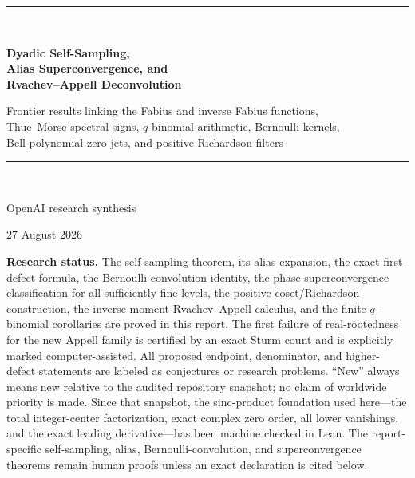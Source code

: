\documentclass[11pt]{article}
\numberwithin{equation}{section}
\theoremstyle{definition}
\theoremstyle{remark}
\begin{document}
\hypersetup{pageanchor=false}

\begin{titlepage}
\centering
\vspace*{1.0cm}
{\color{navy}\rule{0.84\textwidth}{1.2pt}}\\[0.95cm]
{\Huge\bfseries\color{navy} Dyadic Self-Sampling,\\[0.18em]
Alias Superconvergence, and\\[0.18em]
Rvachev--Appell Deconvolution\par}
\vspace{0.65cm}
{\Large\color{teal}Frontier results linking the Fabius and inverse Fabius functions,\\
Thue--Morse spectral signs, $q$-binomial arithmetic, Bernoulli kernels,\\
Bell-polynomial zero jets, and positive Richardson filters\par}
\vspace{0.9cm}
{\color{navy}\rule{0.84\textwidth}{0.6pt}}\\[1.15cm]
{\large OpenAI research synthesis\par}
\vspace{0.25cm}
{\large 27 August 2026\par}
\vfill
\begin{minipage}{0.90\textwidth}
\small
\textbf{Research status.}
The self-sampling theorem, its alias expansion, the exact first-defect formula, the Bernoulli convolution identity, the phase-superconvergence classification for all sufficiently fine levels, the positive coset/Richardson construction, the inverse-moment Rvachev--Appell calculus, and the finite $q$-binomial corollaries are proved in this report.  The first failure of real-rootedness for the new Appell family is certified by an exact Sturm count and is explicitly marked computer-assisted.  All proposed endpoint, denominator, and higher-defect statements are labeled as conjectures or research problems.  ``New'' always means new relative to the audited repository snapshot; no claim of worldwide priority is made.  Since that snapshot, the sinc-product foundation used here---the total integer-center factorization, exact complex zero order, all lower vanishings, and the exact leading derivative---has been machine checked in Lean.  The report-specific self-sampling, alias, Bernoulli-convolution, and superconvergence theorems remain human proofs unless an exact declaration is cited below.
\end{minipage}
\vfill
\end{titlepage}
\end{document}
